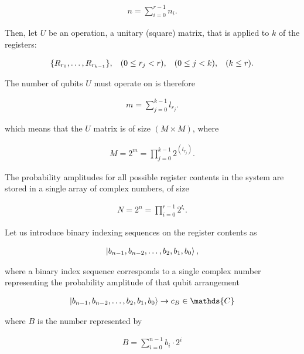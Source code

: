 \begin{align*}
    n = \sum\limits_{i=0}^{r-1}n_{i}.
\end{align*}

Then, let $U$ be an operation, a unitary (square) matrix, that is applied to $k$ of the registers:

\begin{align*}
\{R_{r_0},\dots{},R_{r_{k-1}}\},\hspace{3mm} (0\leq{}r_j<r),\hspace{3mm} (0\leq{}j<k),\hspace{3mm} (k\leq{}r).
\end{align*}

The number of qubits $U$ must operate on is therefore

\begin{align*}
    m = \sum\limits_{j=0}^{k-1}l_{r_j}.
\end{align*}

which means that the $U$ matrix is of size $(M\times{}M)$, where

\begin{align*}
M = 2^m = \prod\limits_{j=0}^{k-1} 2^{(l_{r_j})}.
\end{align*}

The probability amplitudes for all possible register contents in the system are stored in a single array of complex numbers, of size 

\begin{align*}
N = 2^n = \prod\limits_{i=0}^{r-1} 2^{l_i}.
\end{align*}

Let us introduce binary indexing sequences on the register contents as

\begin{align*}
\ket{b_{n-1},b_{n-2},\dots{},b_2,b_1,b_0},
\end{align*}

where a binary index sequence corresponds to a single complex number representing the probability amplitude of that qubit arrangement

\begin{align*}
\ket{b_{n-1},b_{n-2},\dots{},b_2,b_1,b_0} \rightarrow c_{B}\in{}\mathds{C}
\end{align*}

where $B$ is the number represented by 

\begin{align*}
B = \sum\limits_{i=0}^{n-1}b_i\cdot{}2^{i}
\end{align*}

